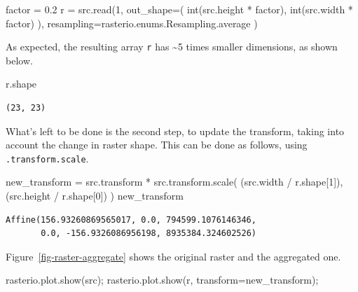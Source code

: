 \documentclass[
  letterpaper,
]{krantz}
\newenvironment{Shaded}{\begin{snugshade}}{\end{snugshade}}
\newcommand{\BuiltInTok}[1]{\textcolor[rgb]{0.00,0.23,0.31}{#1}}
\newcommand{\DecValTok}[1]{\textcolor[rgb]{0.68,0.00,0.00}{#1}}
\newcommand{\FloatTok}[1]{\textcolor[rgb]{0.68,0.00,0.00}{#1}}
\newcommand{\NormalTok}[1]{\textcolor[rgb]{0.00,0.23,0.31}{#1}}
\newcommand{\OperatorTok}[1]{\textcolor[rgb]{0.37,0.37,0.37}{#1}}
\begin{document}
\begin{Shaded}
\begin{Highlighting}[]
\NormalTok{factor }\OperatorTok{=} \FloatTok{0.2}
\NormalTok{r }\OperatorTok{=}\NormalTok{ src.read(}\DecValTok{1}\NormalTok{,}
\NormalTok{    out\_shape}\OperatorTok{=}\NormalTok{(}
        \BuiltInTok{int}\NormalTok{(src.height }\OperatorTok{*}\NormalTok{ factor),}
        \BuiltInTok{int}\NormalTok{(src.width }\OperatorTok{*}\NormalTok{ factor)}
\NormalTok{        ),}
\NormalTok{    resampling}\OperatorTok{=}\NormalTok{rasterio.enums.Resampling.average}
\NormalTok{)}
\end{Highlighting}
\end{Shaded}

As expected, the resulting array \texttt{r} has \textasciitilde5 times
smaller dimensions, as shown below.

\begin{Shaded}
\begin{Highlighting}[]
\NormalTok{r.shape}
\end{Highlighting}
\end{Shaded}

\begin{verbatim}
(23, 23)
\end{verbatim}

What's left to be done is the second step, to update the transform,
taking into account the change in raster shape. This can be done as
follows, using \texttt{.transform.scale}.

\begin{Shaded}
\begin{Highlighting}[]
\NormalTok{new\_transform }\OperatorTok{=}\NormalTok{ src.transform }\OperatorTok{*}\NormalTok{ src.transform.scale(}
\NormalTok{    (src.width }\OperatorTok{/}\NormalTok{ r.shape[}\DecValTok{1}\NormalTok{]),}
\NormalTok{    (src.height }\OperatorTok{/}\NormalTok{ r.shape[}\DecValTok{0}\NormalTok{])}
\NormalTok{)}
\NormalTok{new\_transform}
\end{Highlighting}
\end{Shaded}

\begin{verbatim}
Affine(156.93260869565017, 0.0, 794599.1076146346,
       0.0, -156.9326086956198, 8935384.324602526)
\end{verbatim}

Figure~\ref{fig-raster-aggregate} shows the original raster and the
aggregated one.

\begin{Shaded}
\begin{Highlighting}[]
\NormalTok{rasterio.plot.show(src)}\OperatorTok{;}
\NormalTok{rasterio.plot.show(r, transform}\OperatorTok{=}\NormalTok{new\_transform)}\OperatorTok{;}
\end{Highlighting}
\end{Shaded}
\end{document}
